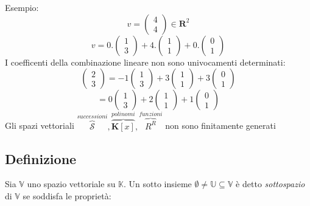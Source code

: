 \documentclass[12pt]{article}
\begin{document}
Esempio:
\[v = \begin{pmatrix}
    4\\
    4
\end{pmatrix} \in \mathbf{R}^2\]
\[v = 0. \begin{pmatrix}
    1\\
    3
\end{pmatrix} + 4.\begin{pmatrix}
    1\\
    1
\end{pmatrix} + 0.\begin{pmatrix}
    0\\
    1
\end{pmatrix}\]
I coefficenti della combinazione lineare non sono univocamenti determinati:
\[\begin{pmatrix}
    2\\
    3
\end{pmatrix} = -1\begin{pmatrix}
    1\\
    3
\end{pmatrix} + 3\begin{pmatrix}
    1\\
    1
\end{pmatrix} + 3\begin{pmatrix}
    0\\
    1
\end{pmatrix}\]
\[= 0 \begin{pmatrix}
    1\\
    3
\end{pmatrix} + 2 \begin{pmatrix}
    1\\
    1
\end{pmatrix}+ 1 \begin{pmatrix}
    0\\
    1
\end{pmatrix}\]
Gli spazi vettoriali $\overbrace{\mathcal{S}}^{successioni}, \overbrace{\mathbf{K}[x]}^{polinomi}, \overbrace{R^R}^{funzioni}$
non sono finitamente generati

\subsection{Definizione}

Sia $\mathbb{V}$ uno spazio vettoriale su $\mathbb{K}$. Un sotto insieme $\emptyset \neq \mathbb{U} \subseteq \mathbb{V}$ è detto \textit{sottospazio} di $\mathbb{V}$ se soddisfa le proprietà:
\end{document}

